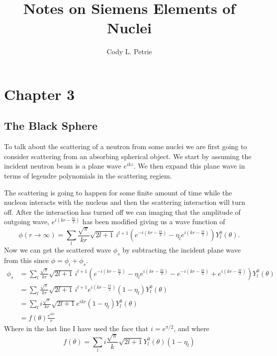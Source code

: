 \documentclass[12pt]{extarticle}
\title{Notes on Siemens Elements of Nuclei}
\author{Cody L. Petrie}
\begin{document}
\maketitle

\section*{Chapter 3}
\subsection*{The Black Sphere}
To talk about the scattering of a neutron from some nuclei we are first going to consider scattering from an absorbing spherical object. We start by assuming the incident neutron beam is a plane wave $e^{ikz}$. We then expand this plane wave in terms of legendre polynomials in the scattering regiem.



The scattering is going to happen for some finite amount of time while the nucleon interacts with the nucleus and then the scattering interaction will turn off. After the interaction has turned off we can imaging that the amplitude of outgoing wave, $e^{i(kr-\frac{l\pi}{2})}$ has been modified giving us a wave function of
\begin{equation}
   \phi(r\rightarrow\infty) = \sum\limits_l \frac{\sqrt{\pi}}{kr} \sqrt{2l+1} \, i^{l+1} \left( e^{-i(kr-\frac{l\pi}{2})} - \eta_l e^{i(kr-\frac{l\pi}{2})} \right) Y_l^0(\theta).
\end{equation}
Now we can get the scattered wave $\phi_s$ by subtracting the incident plane wave from this since $\phi = \phi_i + \phi_s$.
\begin{align}
   \phi_s &= \sum\limits_l \frac{\sqrt{\pi}}{kr} \sqrt{2l+1} \, i^{l+1} \left( e^{-i(kr-\frac{l\pi}{2})} - \eta_l e^{i(kr-\frac{l\pi}{2})} - e^{-i(kr-\frac{l\pi}{2})} + e^{i(kr-\frac{l\pi}{2})} \right) Y_l^0(\theta) \\
   &= \sum\limits_l \frac{\sqrt{\pi}}{kr} \sqrt{2l+1} \, i^{l+1} e^{i(kr-\frac{l\pi}{2})}(1 - \eta_l) Y_l^0(\theta) \\
   &= \sum\limits_l i \frac{\sqrt{\pi}}{kr} \sqrt{2l+1} e^{ikr}(1 - \eta_l) Y_l^0(\theta) \\
   &= f(\theta) \frac{e^{ikr}}{r}
\end{align}
Where in the last line I have used the face that $i=e^{\pi/2}$, and where
\begin{equation}
   f(\theta) = \sum\limits_l i \frac{\sqrt{\pi}}{k}\sqrt{2l+1} Y_l^0(\theta) (1-\eta_l)
   \label{eq:fullscatamp}
\end{equation}
\end{document}
